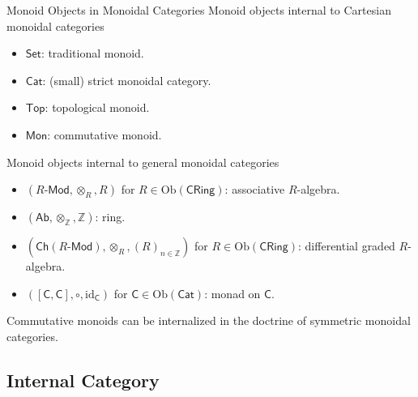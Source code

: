 \begin{example}{Monoid Objects in Monoidal Categories}{}
    Monoid objects internal to Cartesian monoidal categories
    \begin{itemize}
        \item $\mathsf{Set}$: traditional monoid.
        \item $\mathsf{Cat}$: (small) strict monoidal category.
        \item $\mathsf{Top}$: topological monoid.
        \item $\mathsf{Mon}$: commutative monoid.
    \end{itemize}
    Monoid objects internal to general monoidal categories
    \begin{itemize}
        \item $(R\text{-}\mathsf{Mod},\otimes_{R}, R)$ for $R\in \mathrm{Ob}(\mathsf{CRing})$: associative $R$-algebra.
        \item $(\mathsf{Ab},\otimes_{\mathbb{Z}}, \mathbb{Z})$: ring.
        \item $\left(\mathsf{Ch}\left(R\text{-}\mathsf{Mod}\right),\otimes_{R}, (R)_{n\in\mathbb{Z}}\right)$ for $R\in \mathrm{Ob}(\mathsf{CRing})$:  differential graded $R$-algebra.
        \item $\left([\mathsf{C},\mathsf{C}], \circ, \mathrm{id}_{\mathsf{C}}\right)$ for $\mathsf{C}\in \mathrm{Ob}(\mathsf{Cat})$: monad on $\mathsf{C}$.
    \end{itemize}
\end{example}

Commutative monoids can be internalized in the doctrine of symmetric monoidal categories.


\subsection{Internal Category}

